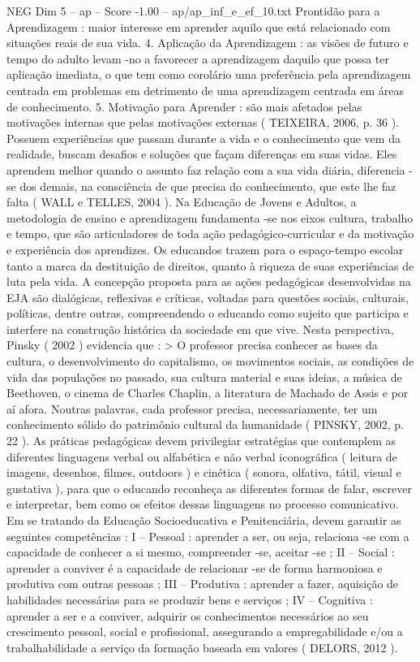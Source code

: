 \begin{textsample}{NEG Dim 5 – ap – Score -1.00 – ap/ap\_inf\_e\_ef\_10.txt}
Prontidão para a Aprendizagem : maior interesse em aprender aquilo que está relacionado com situações reais de sua vida. 4.
Aplicação da Aprendizagem : as visões de futuro e tempo do adulto levam -no a favorecer a aprendizagem daquilo que possa ter aplicação imediata, o que tem como corolário uma preferência pela aprendizagem centrada em problemas em detrimento de uma aprendizagem centrada em áreas de conhecimento. 5.
Motivação para Aprender : são mais afetados pelas motivações internas que pelas motivações externas ( TEIXEIRA, 2006, p. 36 ).
Possuem experiências que passam durante a vida e o conhecimento que vem da realidade, buscam desafios e soluções que façam diferenças em suas vidas.
Eles aprendem melhor quando o assunto faz relação com a sua vida diária, diferencia -se dos demais, na consciência de que precisa do conhecimento, que este lhe faz falta ( WALL e TELLES, 2004 ).
Na Educação de Jovens e Adultos, a metodologia de ensino e aprendizagem fundamenta -se nos eixos cultura, trabalho e tempo, que são articuladores de toda ação pedagógico-curricular e da motivação e experiência dos aprendizes.
Os educandos trazem para o espaço-tempo escolar tanto a marca da destituição de direitos, quanto à riqueza de suas experiências de luta pela vida.
A concepção proposta para as ações pedagógicas desenvolvidas na EJA são dialógicas, reflexivas e críticas, voltadas para questões sociais, culturais, políticas, dentre outras, compreendendo o educando como sujeito que participa e interfere na construção histórica da sociedade em que vive.
Nesta perspectiva, Pinsky ( 2002 ) evidencia que : > O professor precisa conhecer as bases da cultura, o desenvolvimento do capitalismo, os movimentos sociais, as condições de vida das populações no passado, sua cultura material e suas ideias, a música de Beethoven, o cinema de Charles Chaplin, a literatura de Machado de Assis e por aí afora.
Noutras palavras, cada professor precisa, necessariamente, ter um conhecimento sólido do patrimônio cultural da humanidade ( PINSKY, 2002, p. 22 ).
As práticas pedagógicas devem privilegiar estratégias que contemplem as diferentes linguagens verbal ou alfabética e não verbal iconográfica ( leitura de imagens, desenhos, filmes, outdoors ) e cinética ( sonora, olfativa, tátil, visual e gustativa ), para que o educando reconheça as diferentes formas de falar, escrever e interpretar, bem como os efeitos dessas linguagens no processo comunicativo.
Em se tratando da Educação Socioeducativa e Penitenciária, devem garantir as seguintes competências : I – Pessoal : aprender a ser, ou seja, relaciona -se com a capacidade de conhecer a si mesmo, compreender -se, aceitar -se ; II – Social : aprender a conviver é a capacidade de relacionar -se de forma harmoniosa e produtiva com outras pessoas ; III – Produtiva : aprender a fazer, aquisição de habilidades necessárias para se produzir bens e serviços ; IV – Cognitiva : aprender a ser e a conviver, adquirir os conhecimentos necessários ao seu crescimento pessoal, social e profissional, assegurando a empregabilidade e/ou a trabalhabilidade a serviço da formação baseada em valores ( DELORS, 2012 ).

\end{textsample}
